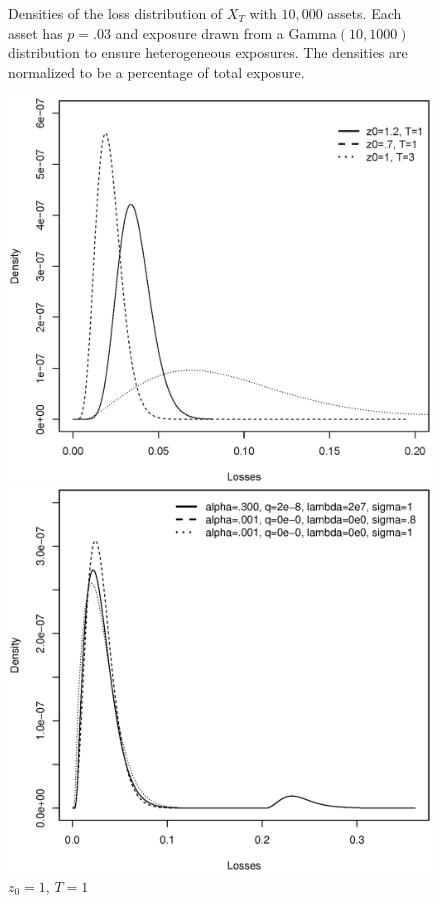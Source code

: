 \documentclass[12pt]{article}
\theoremstyle{definition}
\begin{document}
\begin{figure}[htb]
\begin{framed}
Densities of the loss distribution of \(X_T\) with \(10,000\) assets.  Each asset has \(p=.03\) and exposure drawn from a Gamma\((10, 1000)\) distribution to ensure heterogeneous exposures. The densities are normalized to be a percentage of total exposure. \newline
\begin{minipage}[t]{.48\textwidth}
\centering
\includegraphics[width=1\textwidth]{Stahl6-9-2015Fig1}
\caption{\(\alpha=.3\), \(\sigma=.5\), \(\lambda=0\), \(q=0\).  \label{fig5}}
\end{minipage}\hfill
\begin{minipage}[t]{.48\textwidth}
\centering
\includegraphics[width=1\textwidth]{Stahl6-9-2015Fig2}
\caption{\(z_0=1\), \(T=1\)  \label{fig6}}
\end{minipage}\hfill
\end{framed}
\end{figure}
\end{document}
